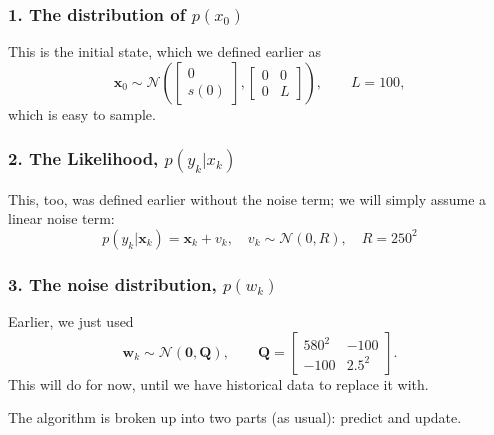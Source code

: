 \documentclass[11pt]{article}\usepackage[]{graphicx}\usepackage[]{color}
\newcommand{\bx}{\boldsymbol{x}}
\newcommand{\bw}{\boldsymbol{w}}
\newcommand{\bQ}{\boldsymbol{Q}}
\newcommand{\bZero}{\boldsymbol{0}}
\begin{document}
\subsubsection*{1. The distribution of $p\left(x_0\right)$}

This is the initial state, which we defined earlier as
\begin{equation}
  \label{eq:initial_state}
  \bx_0 \sim \mathcal{N}\left(
    \begin{bmatrix}
      0 \\ s(0)
    \end{bmatrix},
    \begin{bmatrix}
      0 & 0 \\ 0 & L
    \end{bmatrix}
  \right),
  \quad\quad L = 100,
\end{equation}
which is easy to sample.



\subsubsection*{2. The Likelihood, $p\left(y_k | x_k\right)$}

This, too, was defined earlier without the noise term; we will simply assume a linear noise term:
\begin{equation}
  \label{eq:likelihood_pf}
  p\left(y_k | \bx_k\right) = \bx_k +  v_{k},\quad
  v_k \sim \mathcal{N}\left(0,R\right),\quad
  R = 250^2
\end{equation}



\subsubsection*{3. The noise distribution,  $p\left(w_k\right)$}

Earlier, we just used
\begin{equation}
  \label{eq:system_noise}
  \bw_k \sim \mathcal{N}\left(\bZero, \bQ\right),
  \quad\quad 
  \bQ = 
  \begin{bmatrix}
    580^2 & -100 \\ -100 & 2.5^2
  \end{bmatrix}.
\end{equation}
This will do for now, until we have historical data to replace it with.




The algorithm is broken up into two parts (as usual): predict and update.
\end{document}
